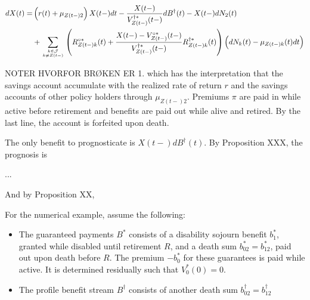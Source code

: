 \documentclass{book}
\newcommand{\1}[1]{\mathbbm{1}_{\left\lbrace #1 \right\rbrace}}
\theoremstyle{break}
\theoremstyle{remark}
\numberwithin{equation}{section}
\begin{document}
\begin{example}
\begin{align*}
	dX(t) =& \left( r(t) + \mu_{Z(t-)2} \right) X(t-) dt - \frac{X(t-)}{V_{Z(t-)}^{\dagger*}(t-)} dB^\dagger(t) - X(t-) dN_2(t) \\
	&+ \sum_{k \in \mathcal{J} \atop k \neq Z(t-)} \left( R_{Z(t-)k}^{\circ*}(t) + \frac{X(t-) - V_{Z(t-)}^{\circ*}(t-)}{V_{Z(t-)}^{\dagger*}(t-)} R_{Z(t-)k}^{\dagger*}(t) \right) \left( dN_k(t) - \mu_{Z(t-)k}(t) dt \right) \\
\end{align*}

NOTER HVORFOR BRØKEN ER 1. which has the interpretation that the savings account accumulate with the realized rate of return $r$ and the savings accounts of other policy holders through $\mu_{Z(t-)2}$. Premiums $\pi$ are paid in while active before retirement and benefits are paid out while alive and retired. By the last line, the account is forfeited upon death.

The only benefit to prognosticate is $X(t-)dB^\dagger(t)$. By Proposition XXX, the prognosis is

...

And by Proposition XX, 

\end{example}




\begin{example}
	
For the numerical example, assume the following:

\begin{itemize}
	\item The guaranteed payments $B^*$ consists of a disability sojourn benefit $b_1^*$, granted while disabled until retirement $R$, and a death sum $b_{02}^*=b_{12}^*$, paid out upon death before $R$. The premium $-b_0^*$ for these guarantees is paid while active. It is determined residually such that $V_0^*(0)=0$.
	\item The profile benefit stream $B^\dagger$ consists of another death sum $b_{02}^\dagger=b_{12}^\dagger$
\end{itemize}
	
\end{example}
\end{document}
